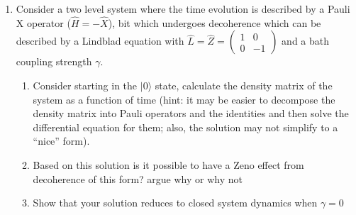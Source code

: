 \documentclass[english]{article}
\newcommand{\ket}[1]{|#1 \rangle}
\newcommand{\ketbra}[2]{\vert #1 \rangle \! \langle #2 \vert}
\begin{document}
\begin{enumerate}
\begin{enumerate}
\item Calculate the eigenvalues and eigenvectors of $\hat{X}+i\Gamma\ketbra{+}{+}$, is there a state which can be prepared which does not decay, does $\Gamma$ have to be large for this to happen? Is the reason the state does not decay because of a Zeno effect or for another reason?
\item Now consider I change the dynamics of the system such that the evolution is governed by $\exp\left(\frac{i t \pi }{2 \tau} (\hat{Z}+i\Gamma\ketbra{+}{+})\right)$, is there a Zeno effect in this case, if so what state is maintained in the limit of large $\Gamma$?
\end{enumerate}
\item Consider a two level system where the time evolution is described by a Pauli X operator ($\hat{H}=-\hat{X}$), bit which undergoes decoherence which can be described by a Lindblad equation with $\hat{L}=\hat{Z}=\left( \begin{array}{cc} 1& 0 \\ 0 & -1 \end{array} \right)$ and a bath coupling strength $\gamma$.
\begin{enumerate}
\item Consider starting in the $\ket{0}$ state, calculate the density matrix of the system as a function of time (hint: it may be easier to decompose the density matrix into Pauli operators and the identities and then solve the differential equation for them; also, the solution may not simplify to a ``nice'' form).
\item Based on this solution is it possible to have a Zeno effect from decoherence of this form? argue why or why not
\item Show that your solution reduces to closed system dynamics when $\gamma=0$
\end{enumerate}

\end{enumerate}
\end{document}
